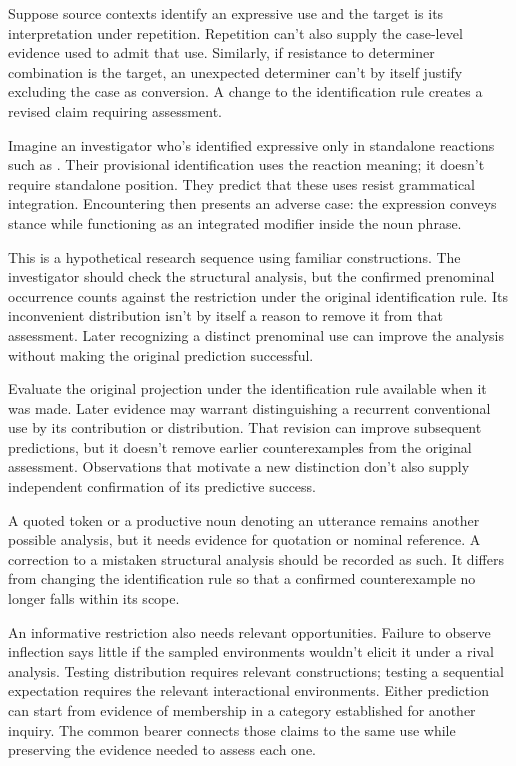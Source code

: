 \documentclass[12pt]{article}
\begin{document}
Suppose source contexts identify an expressive use and the target is
its interpretation under repetition. Repetition can't also supply the
case-level evidence used to admit that use. Similarly, if resistance
to determiner combination is the target, an unexpected determiner
can't by itself justify excluding the case as conversion. A change
to the identification rule creates a revised claim requiring assessment.

Imagine an investigator who's identified expressive 
only in standalone reactions such as . Their provisional identification uses the reaction meaning;
it doesn't require standalone position. They predict that these uses
resist grammatical integration. Encountering  then presents an adverse case: the expression conveys stance
while functioning as an integrated modifier inside the noun phrase.

This is a hypothetical research sequence using familiar constructions.
The investigator should check the structural analysis, but the confirmed
prenominal occurrence counts against the restriction under the original
identification rule. Its inconvenient distribution isn't by itself a
reason to remove it from that assessment. Later recognizing a distinct
prenominal use can improve the analysis without making the original
prediction successful.

Evaluate the original projection under the identification rule available
when it was made. Later evidence may warrant distinguishing a recurrent
conventional use by its contribution or distribution. That revision
can improve subsequent predictions, but it doesn't remove earlier
counterexamples from the original assessment. Observations that motivate
a new distinction don't also supply independent confirmation of its
predictive success.

A quoted token or a productive noun denoting an utterance remains
another possible analysis, but it needs evidence for quotation or
nominal reference. A correction to a mistaken structural analysis should
be recorded as such. It differs from changing the identification rule
so that a confirmed counterexample no longer falls within its scope.

An informative restriction also needs relevant opportunities. Failure
to observe inflection says little if the sampled environments wouldn't
elicit it under a rival analysis. Testing distribution requires relevant
constructions; testing a sequential expectation requires the relevant
interactional environments. Either prediction can start from evidence
of membership in a category established for another inquiry. The common
bearer connects those claims to the same use while preserving the
evidence needed to assess each one.
\end{document}
